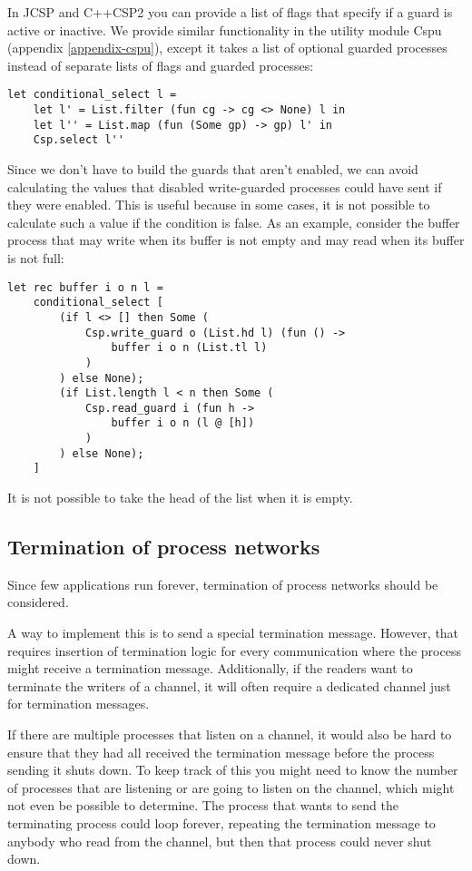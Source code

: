\documentclass[a4paper,12pt]{article}
\begin{document}
In JCSP and C++CSP2 you can provide a list of flags that specify if a guard is
active or inactive. We provide similar functionality in the utility module Cspu
(appendix \ref{appendix-cspu}), except it takes a list of optional guarded
processes instead of separate lists of flags and guarded processes:

\goodbreak
\begin{verbatim}
let conditional_select l =
    let l' = List.filter (fun cg -> cg <> None) l in
    let l'' = List.map (fun (Some gp) -> gp) l' in
    Csp.select l''
\end{verbatim}

Since we don't have to build the guards that aren't enabled, we can avoid
calculating the values that disabled write-guarded processes could have sent if
they were enabled. This is useful because in some cases, it is not possible to
calculate such a value if the condition is false. As an example, consider the
buffer process that may write when its buffer is not empty and may read when its
buffer is not full:

\goodbreak
\begin{verbatim}
let rec buffer i o n l =
    conditional_select [
        (if l <> [] then Some (
            Csp.write_guard o (List.hd l) (fun () -> 
                buffer i o n (List.tl l)
            )
        ) else None);
        (if List.length l < n then Some (
            Csp.read_guard i (fun h -> 
                buffer i o n (l @ [h])
            )
        ) else None);
    ]
\end{verbatim}

It is not possible to take the head of the list when it is empty.


\subsection{Termination of process networks}
Since few applications run forever, termination of process networks should be
considered.

A way to implement this is to send a special termination message. However,
that requires insertion of termination logic for every communication where the
process might receive a termination message. Additionally, if the readers want
to terminate the writers of a channel, it will often require a dedicated channel
just for termination messages.

If there are multiple processes that listen on a channel, it would also be hard
to ensure that they had all received the termination message before the process
sending it shuts down. To keep track of this you might need to know the number
of processes that are listening or are going to listen on the channel, which
might not even be possible to determine. The process that wants to send the
terminating process could loop forever, repeating the termination message to
anybody who read from the channel, but then that process could never shut down.
\end{document}
